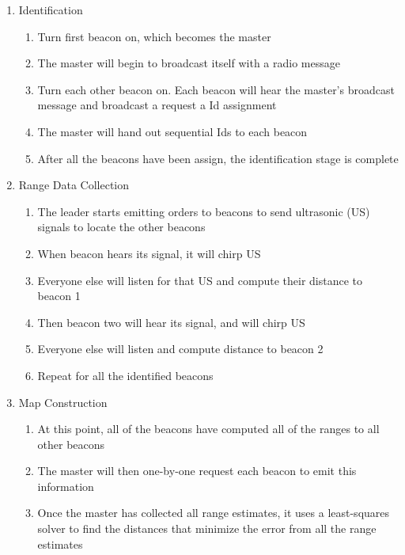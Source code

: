 \documentclass{article}
\begin{document}
    \begin{enumerate}
      \item Identification \\
        \begin{enumerate}
          \item Turn first beacon on, which becomes the master
          \item The master will begin to broadcast itself with a radio message
          \item Turn each other beacon on. Each beacon will hear the master's broadcast message and broadcast a request a Id assignment
          \item The master will hand out sequential Ids to each beacon
          \item After all the beacons have been assign, the identification stage is complete
        \end{enumerate}
      \item Range Data Collection \\
        \begin{enumerate}
          \item The leader starts emitting orders to beacons to send ultrasonic (US) signals to locate the other beacons
          \item When beacon hears its signal, it will chirp US
          \item Everyone else will listen for that US and compute their distance to beacon 1
          \item Then beacon two will hear its signal, and will chirp US
          \item Everyone else will listen and compute distance to beacon 2
          \item Repeat for all the identified beacons
        \end{enumerate}
      \item Map Construction \\
        \begin{enumerate}
          \item At this point, all of the beacons have computed all of the ranges to all other beacons
          \item The master will then one-by-one request each beacon to emit this information
          \item Once the master has collected all range estimates, it uses a least-squares solver to find the distances that minimize the error from all the range estimates
        \end{enumerate}
    \end{enumerate}
\end{document}
